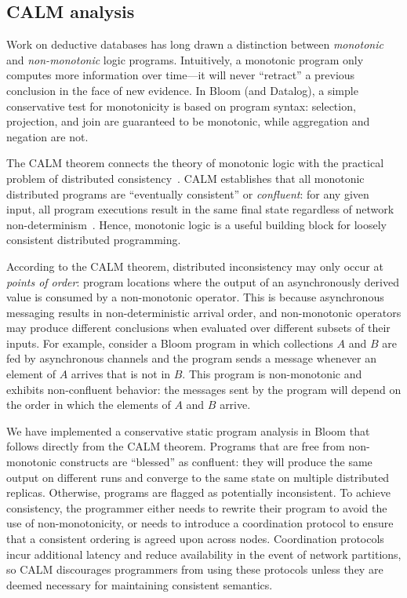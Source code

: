 \subsection{CALM analysis}
\label{sec:bg-calm}

Work on deductive databases has long drawn a distinction between
\emph{monotonic} and \emph{non-monotonic} logic programs. Intuitively, a
monotonic program only computes more information over time---it will never
``retract'' a previous conclusion in the face of new evidence.  In Bloom (and
Datalog), a simple conservative test for monotonicity is based on program
syntax: selection, projection, and join are guaranteed to be monotonic, while aggregation and negation are not.

The CALM theorem connects the theory of monotonic logic with the practical
problem of distributed consistency~\cite{Alvaro2011,podskey}.  CALM establishes that all
monotonic distributed programs are ``eventually consistent'' or
\emph{confluent}: for any given input, all program executions result in the same
final state regardless of network
non-determinism~\cite{Ameloot2011,marczak2012}.  Hence, monotonic logic is
a useful building block for loosely consistent distributed programming.

According to the CALM theorem, distributed inconsistency may only occur at
\emph{points of order}: program locations where the output of an asynchronously
derived value is consumed by a non-monotonic operator.  This is because
asynchronous messaging results in non-deterministic arrival order, and
non-monotonic operators may produce different conclusions when evaluated over
different subsets of their inputs.  For example, consider a Bloom program in
which collections $A$ and $B$ are fed by asynchronous channels and the program
sends a message whenever an element of $A$ arrives that is not in $B$. This
program is non-monotonic and exhibits non-confluent behavior: the messages sent
by the program will depend on the order in which the elements of $A$ and $B$
arrive.

We have implemented a conservative static program analysis in Bloom that follows
directly from the CALM theorem.  Programs that are free from non-monotonic
constructs are ``blessed'' as confluent: they will produce the same output on different
runs and converge to the same state on multiple distributed replicas.
Otherwise, programs are flagged as potentially inconsistent.  To achieve
consistency, the programmer either needs to rewrite their program to avoid the
use of non-monotonicity, or needs to introduce a coordination protocol to ensure that a
consistent ordering is agreed upon across nodes. Coordination protocols incur additional
latency and reduce availability in the event of network partitions, so CALM discourages programmers from using these protocols unless they are deemed necessary for maintaining consistent semantics.

